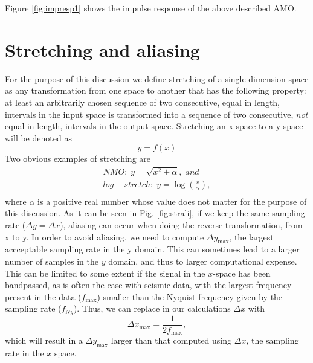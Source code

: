 Figure \ref{fig:impresp1} shows the impulse response of the above
described AMO.

\section{Stretching and aliasing}

For the purpose of this discussion we define stretching of a
single-dimension space as any transformation from one space to
another that has the following property: at least an arbitrarily chosen sequence
of two consecutive, equal in length, intervals in the input space is
transformed into a sequence of two consecutive, $not$ equal in length,
intervals in the output space. Stretching an x-space to a y-space will be denoted as 
\begin{equation}
\label{eqn:str}
y = f(x)
\end{equation}
Two obvious examples of stretching are
\[
\begin{array}{l}
 NMO:\;y = \sqrt {x^2  + \alpha } ,\;and \\ 
 log-stretch:\;y = \log \left( {\frac{x}{\alpha }} \right), \\ 
 \end{array}
\]
where $\alpha$ is a positive real number whose value does not matter
for the purpose of this discussion. As it can be seen in
Fig. \ref{fig:strali}, if we keep the same sampling rate ($\Delta y =
\Delta x$), aliasing can occur when doing the reverse transformation,
from x to y. In order to avoid aliasing, we need to compute $\Delta
y_{\max }$, the largest accceptable sampling rate in the y
domain. This can sometimes lead to a larger number of samples in the
$y$ domain, and thus to larger computational expense. This can be
limited to some extent if the signal in the $x$-space has been
bandpassed, as is often the case with seismic data, with the largest
frequency present in the data ($f_{\max}$) smaller than the Nyquist
frequency given by the sampling rate ($f_{Ny}$). Thus, we can replace in our calculations $\Delta x$ with
\[
\Delta x_{\max }  = \frac{1}{{2f_{\max } }},
\]
which will result in a $\Delta y_{\max }$ larger than that computed using $\Delta x$, the sampling rate in the $x$ space.
